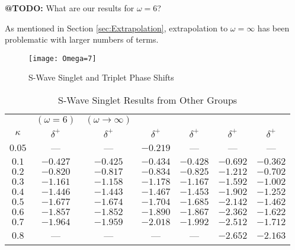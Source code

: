 \documentclass[Dissertation.tex]{subfiles}
\begin{document}
\textbf{@TODO:} What are our results for $\omega = 6$?

As mentioned in Section \ref{sec:Extrapolation}, extrapolation to $\omega = \infty$ has been problematic with larger numbers of terms.

\begin{figure}[H]
	\centering
	\texttt{[image: Omega=7]}
	\caption{S-Wave Singlet and Triplet Phase Shifts}
	\label{fig:SWavePhaseOmega=7}
\end{figure}


\begin{table}[H]
\begin{center}
\begin{tabular}{c c c c c c c}
\toprule
 & $(\omega = 6)$ & $(\omega \rightarrow \infty)$ &  &  &  & \\
$\kappa$ & $\delta^+$ \cite{VanReeth2003} & $\delta^+$ \cite{VanReeth2003} & $\delta^+$ \cite{Blackwood2002} & $\delta^+$ \cite{Walters2004} & $\delta^+$ \cite{Ray1997} & $\delta^+$ \cite{Adhikari1999} \\
\midrule
$0.05$ & --- & --- & $-0.219$ & --- & --- & --- \\
$0.1$ & $-0.427$ & $-0.425$ & $-0.434$ & $-0.428$ & $-0.692$ & $-0.362$ \\
$0.2$ & $-0.820$ & $-0.817$ & $-0.834$ & $-0.825$ & $-1.212$ & $-0.702$ \\
$0.3$ & $-1.161$ & $-1.158$ & $-1.178$ & $-1.167$ & $-1.592$ & $-1.002$ \\
$0.4$ & $-1.446$ & $-1.443$ & $-1.467$ & $-1.453$ & $-1.902$ & $-1.252$ \\
$0.5$ & $-1.677$ & $-1.674$ & $-1.704$ & $-1.685$ & $-2.142$ & $-1.462$ \\
$0.6$ & $-1.857$ & $-1.852$ & $-1.890$ & $-1.867$ & $-2.362$ & $-1.622$ \\
$0.7$ & $-1.964$ & $-1.959$ & $-2.018$ & $-1.992$ & $-2.512$ & $-1.712$ \\
$0.8$ &    --- &    --- &    --- &    --- & $-2.652$ & $-2.163$ \\
\bottomrule
\end{tabular}
\caption{S-Wave Singlet Results from Other Groups}
\label{tab:SWaveSingletOther}
\end{center}
\end{table}
\end{document}
